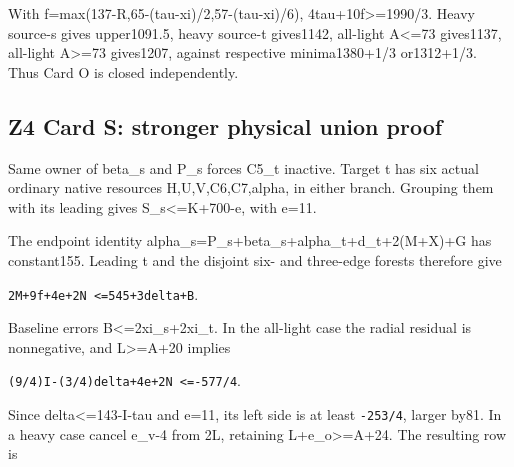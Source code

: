 \documentclass[10pt,a4paper]{article}
\theoremstyle{definition}
\begin{document}
With f=\allowbreak{}max(137-R,\allowbreak{}65-(tau-xi)/2,\allowbreak{}57-(tau-xi)/6),\allowbreak{}
4tau+\allowbreak{}10f\textgreater=\allowbreak{}1990/3. Heavy source-s gives upper1091.5,\allowbreak{} heavy
source-t gives1142,\allowbreak{} all-light A\textless=\allowbreak{}73 gives1137,\allowbreak{} all-light
A\textgreater=\allowbreak{}73 gives1207,\allowbreak{} against respective minima1380+\allowbreak{}1/3
or1312+\allowbreak{}1/3. Thus Card O is closed independently.

\hypertarget{z4-card-s-stronger-physical-union-proof}{%
\subsection{Z4 Card S: stronger physical union
proof}\label{z4-card-s-stronger-physical-union-proof}}

Same owner of beta\_\allowbreak{}s and P\_\allowbreak{}s forces C5\_\allowbreak{}t inactive. Target t has six
actual ordinary native resources H,\allowbreak{}U,\allowbreak{}V,\allowbreak{}C6,\allowbreak{}C7,\allowbreak{}alpha,\allowbreak{} in either branch.
Grouping them with its leading gives S\_\allowbreak{}s\textless=\allowbreak{}K+\allowbreak{}700-e,\allowbreak{} with e=\allowbreak{}11.

The endpoint identity alpha\_\allowbreak{}s=\allowbreak{}P\_\allowbreak{}s+\allowbreak{}beta\_\allowbreak{}s+\allowbreak{}alpha\_\allowbreak{}t+\allowbreak{}d\_\allowbreak{}t+\allowbreak{}2(M+\allowbreak{}X)+\allowbreak{}G has
constant155. Leading t and the disjoint six- and three-edge forests
therefore give

\texttt{2M+\allowbreak{}9f+\allowbreak{}4e+\allowbreak{}2N <=\allowbreak{}545+\allowbreak{}3delta+\allowbreak{}B}.

Baseline errors B\textless=\allowbreak{}2xi\_\allowbreak{}s+\allowbreak{}2xi\_\allowbreak{}t. In the all-light case the
radial residual is nonnegative,\allowbreak{} and L\textgreater=\allowbreak{}A+\allowbreak{}20 implies

\texttt{(9/\allowbreak{}4)I-(3/\allowbreak{}4)delta+\allowbreak{}4e+\allowbreak{}2N <=\allowbreak{}-577/\allowbreak{}4}.

Since delta\textless=\allowbreak{}143-I-tau and e=\allowbreak{}11,\allowbreak{} its left side is at least
\texttt{-253/\allowbreak{}4},\allowbreak{} larger by81. In a heavy case cancel
e\_\allowbreak{}v-4 from 2L,\allowbreak{} retaining L+\allowbreak{}e\_\allowbreak{}o\textgreater=\allowbreak{}A+\allowbreak{}24. The resulting row is
\end{document}

